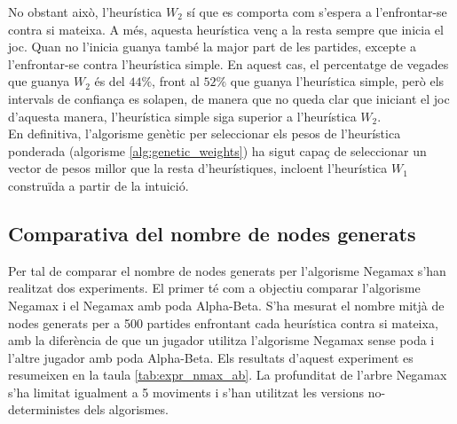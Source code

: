 \documentclass[12pt,a4paper]{article}
\begin{document}
No obstant això, l'heurística $W_2$ sí que es comporta com s'espera a l'enfrontar-se contra si mateixa. A més, aquesta heurística venç a la resta sempre que inicia el joc. Quan no l'inicia guanya també la major part de les partides, excepte a l'enfrontar-se contra l'heurística simple. En aquest cas, el percentatge de vegades que guanya $W_2$ és del $44\%$, front al $52\%$ que guanya l'heurística simple, però els intervals de confiança es solapen, de manera que no queda clar que iniciant el joc d'aquesta manera, l'heurística simple siga superior a l'heurística $W_2$.\\

En definitiva, l'algorisme genètic per seleccionar els pesos de l'heurística ponderada (algorisme \ref{alg:genetic_weights}) ha sigut capaç de seleccionar un vector de pesos millor que la resta d'heurístiques, incloent l'heurística $W_1$ construïda a partir de la intuició.

\subsection{Comparativa del nombre de nodes generats}
Per tal de comparar el nombre de nodes generats per l'algorisme Negamax s'han realitzat dos experiments. El primer té com a objectiu comparar l'algorisme Negamax i el Negamax amb poda Alpha-Beta. S'ha mesurat el nombre mitjà de nodes generats per a 500 partides enfrontant cada heurística contra si mateixa, amb la diferència de que un jugador utilitza l'algorisme Negamax sense poda i l'altre jugador amb poda Alpha-Beta. Els resultats d'aquest experiment es resumeixen en la taula \ref{tab:expr_nmax_ab}. La profunditat de l'arbre Negamax s'ha limitat igualment a 5 moviments i s'han utilitzat les versions no-deterministes dels algorismes.\\
\end{document}
